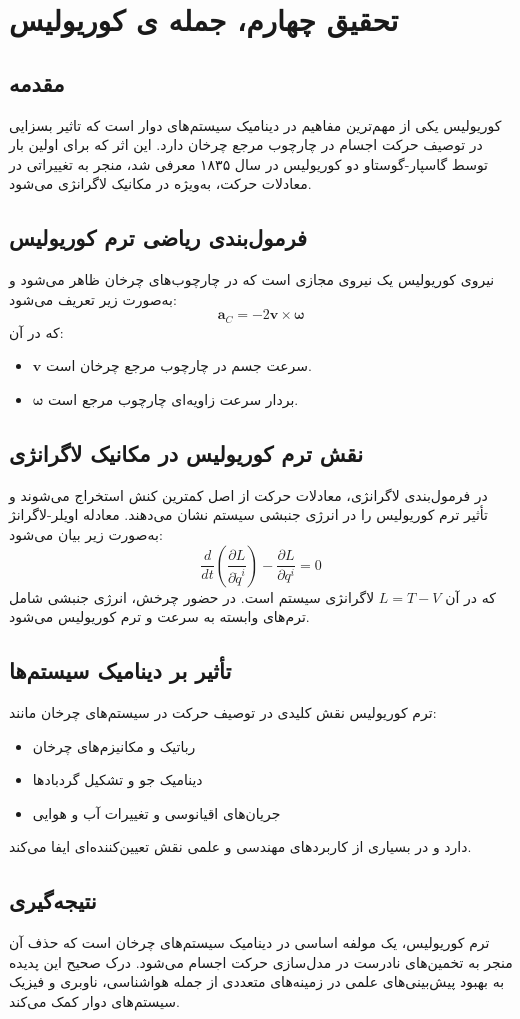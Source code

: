 
\chapter*{تحقیق چهارم، جمله ی کوریولیس}

\section*{مقدمه}
کوریولیس یکی از مهم‌ترین مفاهیم در دینامیک سیستم‌های دوار است که تاثیر بسزایی در توصیف حرکت اجسام در چارچوب مرجع چرخان دارد. این اثر که برای اولین بار توسط گاسپار-گوستاو دو کوریولیس در سال ۱۸۳۵ معرفی شد، منجر به تغییراتی در معادلات حرکت، به‌ویژه در مکانیک لاگرانژی می‌شود.

\section*{فرمول‌بندی ریاضی ترم کوریولیس}
نیروی کوریولیس یک نیروی مجازی است که در چارچوب‌های چرخان ظاهر می‌شود و به‌صورت زیر تعریف می‌شود:
\begin{equation}
	\mathbf{a}_C = -2\mathbf{v} \times \boldsymbol{\omega}
\end{equation}
که در آن:
\begin{itemize}
	\item \( \mathbf{v} \) سرعت جسم در چارچوب مرجع چرخان است.
	\item \( \boldsymbol{\omega} \) بردار سرعت زاویه‌ای چارچوب مرجع است.
\end{itemize}

\section*{نقش ترم کوریولیس در مکانیک لاگرانژی}
در فرمول‌بندی لاگرانژی، معادلات حرکت از اصل کمترین کنش استخراج می‌شوند و تأثیر ترم کوریولیس را در انرژی جنبشی سیستم نشان می‌دهند. معادله اویلر-لاگرانژ به‌صورت زیر بیان می‌شود:
\begin{equation}
	\frac{d}{dt} \left( \frac{\partial L}{\partial \dot{q}^i} \right) - \frac{\partial L}{\partial q^i} = 0
\end{equation}
که در آن \( L = T - V \) لاگرانژی سیستم است. در حضور چرخش، انرژی جنبشی شامل ترم‌های وابسته به سرعت و ترم کوریولیس می‌شود.

\section*{تأثیر بر دینامیک سیستم‌ها}
ترم کوریولیس نقش کلیدی در توصیف حرکت در سیستم‌های چرخان مانند:
\begin{itemize}
	\item رباتیک و مکانیزم‌های چرخان
	\item دینامیک جو و تشکیل گردبادها
	\item جریان‌های اقیانوسی و تغییرات آب و هوایی
\end{itemize}
دارد و در بسیاری از کاربردهای مهندسی و علمی نقش تعیین‌کننده‌ای ایفا می‌کند.

\section*{نتیجه‌گیری}
ترم کوریولیس، یک مولفه اساسی در دینامیک سیستم‌های چرخان است که حذف آن منجر به تخمین‌های نادرست در مدل‌سازی حرکت اجسام می‌شود. درک صحیح این پدیده به بهبود پیش‌بینی‌های علمی در زمینه‌های متعددی از جمله هواشناسی، ناوبری و فیزیک سیستم‌های دوار کمک می‌کند.
